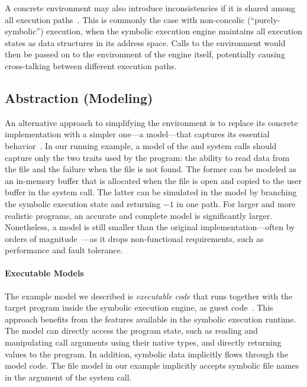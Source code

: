 A concrete environment may also introduce inconsistencies if it is shared among all execution paths~\cite{klee}.
%
This is commonly the case with non-concolic (``purely-symbolic'') execution, when the symbolic execution engine maintains all execution states as data structures in its address space.  Calls to the environment would then be passed on to the environment of the engine itself, potentially causing cross-talking between different execution paths.

\subsection{Abstraction (Modeling)}

An alternative approach to simplifying the environment is to replace its concrete implementation with a simpler one---a model---that captures its essential behavior~\cite{klee,mayhem,aeg}.
%
In our running example, a model of the  and  system calls should capture only the two traits used by the program: the ability to read data from the file and the failure when the file is not found.
%
The former can be modeled as an in-memory buffer that is allocated when the file is open and copied to the user buffer in the  system call.
%
The latter can be simulated in the model by branching the symbolic execution state and returning $-1$ in one path.
%
For larger and more realistic programs, an accurate and complete model is significantly larger.  Nonetheless, a model is still smaller than the original implementation---often by orders of magnitude~\cite{klee}---as it drops non-functional requirements, such as performance and fault tolerance.

\paragraph{Executable Models}

The example model we described is \emph{executable code} that runs together with the target program inside the symbolic execution engine, as guest code~\cite{klee}.
%
This approach benefits from the features available in the symbolic execution runtime.  The model can directly access the program state, such as reading and manipulating call arguments using their native types, and directly returning values to the program.
%
In addition, symbolic data implicitly flows through the model code.  The file model in our example implicitly accepts symbolic file names in the  argument of the  system call.

